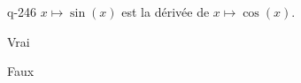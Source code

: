 \begin{truefalse}{q-246}
$x\mapsto \sin(x)$ est la dérivée de $x\mapsto \cos(x)$.
\item Vrai
\item* Faux
\end{truefalse}

